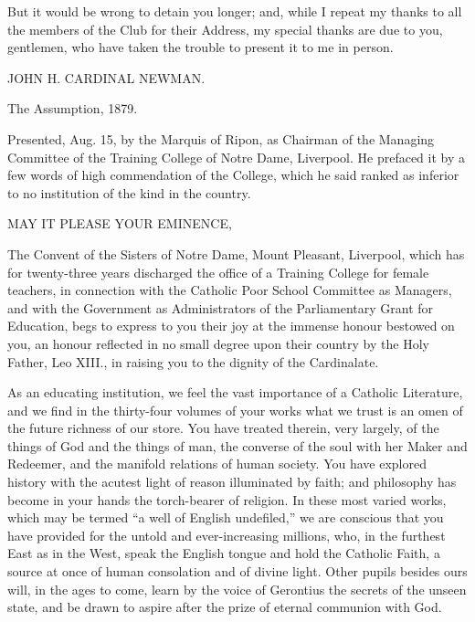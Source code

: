 But it would be wrong to detain you longer; and, while I repeat my
thanks to all the members of the Club for their Address, my special
thanks are due to you, gentlemen, who have taken the trouble to
present it to me in person.

JOHN H. CARDINAL NEWMAN.

The Assumption, 1879.



Presented, Aug. 15, by the Marquis of Ripon, as Chairman of the
Managing Committee of the Training College of Notre Dame, Liverpool.
He prefaced it by a few words of high commendation of the College,
which he said ranked as inferior to no institution of the kind in the
country.

MAY IT PLEASE
YOUR EMINENCE,

The Convent of the Sisters of Notre Dame, Mount Pleasant, Liverpool,
which has for twenty-three years discharged the office of a Training
College for female teachers, in connection with the Catholic
Poor School Committee as Managers, and with the Government as
Administrators of the Parliamentary Grant for Education, begs to
express to you their joy at the immense honour bestowed on you, an
honour reflected in no small degree upon their country by the Holy
Father, Leo XIII., in raising you to the dignity of the Cardinalate.

As an educating institution, we feel the vast importance of a
Catholic Literature, and we find in the thirty-four volumes of your
works what we trust is an omen of the future richness of our store.
You have treated therein, very largely, of the things of God and the
things of man, the converse of the soul with her Maker and Redeemer,
and the manifold relations of human society. You have explored history
with the acutest light of reason illuminated by faith; and philosophy
has become in your hands the torch-bearer of religion. In these most
varied works, which may be termed ``a well of English
undefiled,'' we are conscious that you have provided for the
untold and ever-increasing millions, who, in the furthest East as in
the West, speak the English tongue and hold the Catholic Faith, a
source at once of human consolation and of divine light. Other pupils
besides ours will, in the ages to come, learn by the voice of
Gerontius the secrets of the unseen state, and be drawn to aspire
after the prize of eternal communion with God.

